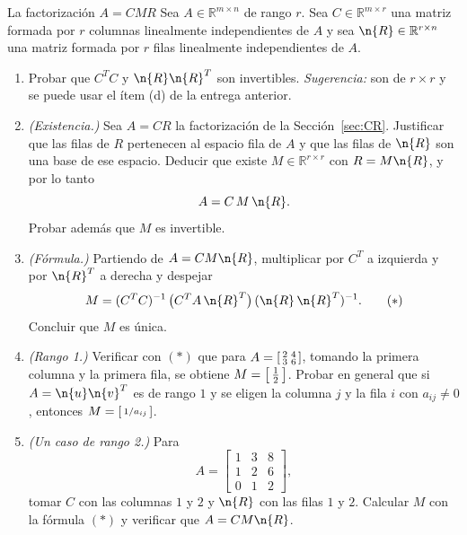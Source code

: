 \begin{entrega}{La factorización $A=CMR$}
Sea $A\in\mathbb{R}^{m\times n}$ de rango $r$. Sea $C\in\mathbb{R}^{m\times r}$
una matriz formada por $r$ columnas linealmente independientes de $A$ y sea
$\n{R}\in\mathbb{R}^{r\times n}$ una matriz formada por $r$ filas linealmente
independientes de $A$.

\begin{enumerate}[label=\textbf{(\alph*)},itemsep=3pt,topsep=4pt]
\item Probar que $C^TC$ y $\n{R}\n{R}^T$ son invertibles. \emph{Sugerencia:} son
de $r\times r$ y se puede usar el ítem (d) de la entrega anterior.

\item \emph{(Existencia.)} Sea $A=CR$ la factorización de la
Sección~\ref{sec:CR}. Justificar que las filas de $R$ pertenecen al espacio fila
de $A$ y que las filas de $\n{R}$ son una base de ese espacio. Deducir que
existe $M\in\mathbb{R}^{r\times r}$ con $R = M\n{R}$, y por lo tanto
\[
A = C\,M\,\n{R}.
\]
Probar además que $M$ es invertible.

\item \emph{(Fórmula.)} Partiendo de $A = CM\n{R}$, multiplicar por $C^T$ a
izquierda y por $\n{R}^T$ a derecha y despejar
\[
M = (C^TC)^{-1}\,\big(C^T A\,\n{R}^T\big)\,(\n{R}\,\n{R}^T)^{-1}.
\tag{$*$}
\]
Concluir que $M$ es única.

\item \emph{(Rango 1.)} Verificar con $(*)$ que para
$A = \begin{bsmallmatrix} 2 & 4\\ 3& 6\end{bsmallmatrix}$, tomando la primera
columna y la primera fila, se obtiene $M = \begin{bsmallmatrix}
\tfrac12\end{bsmallmatrix}$. Probar en general que si $A = \n{u}\n{v}^T$ es de
rango $1$ y se eligen la columna $j$ y la fila $i$ con $a_{ij}\neq 0$, entonces
$M = \begin{bsmallmatrix} 1/a_{ij}\end{bsmallmatrix}$.

\item \emph{(Un caso de rango 2.)} Para
\[
A = \begin{bmatrix} 1 & 3 & 8\\ 1& 2& 6\\ 0&1&2\end{bmatrix},
\]
tomar $C$ con las columnas $1$ y $2$ y $\n{R}$ con las filas $1$ y $2$. Calcular
$M$ con la fórmula $(*)$ y verificar que $A = CM\n{R}$.


\end{enumerate}
\end{entrega}
